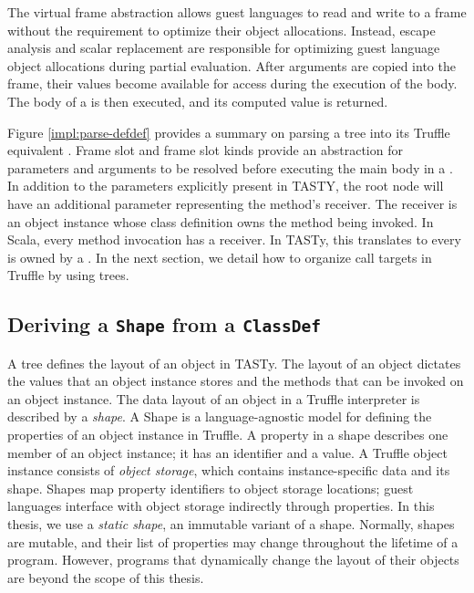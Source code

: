 The virtual frame abstraction allows guest languages to read and write to a frame without the requirement to optimize their object allocations.
Instead, escape analysis and scalar replacement are responsible for optimizing guest language object allocations during partial evaluation. 
After arguments are copied into the frame, their values become available for access during the execution of the body.
The body of a  is then executed, and its computed value is returned.

Figure \ref{impl:parse-defdef} provides a summary on parsing a  tree into its Truffle equivalent .
Frame slot and frame slot kinds provide an abstraction for parameters and arguments to be resolved before executing the main body in a .
In addition to the parameters explicitly present in TASTY, the root node will have an additional parameter representing the method's receiver.
The receiver is an object instance whose class definition owns the method being invoked.
In Scala, every method invocation has a receiver.
In TASTy, this translates to every  is owned by a .
In the next section, we detail how to organize call targets in Truffle by using  trees.

\subsection{Deriving a \texttt{Shape} from a \texttt{ClassDef}}
\label{impl:subsection:classdef}

A  tree defines the layout of an object in TASTy.
The layout of an object dictates the values that an object instance stores and the methods that can be invoked on an object instance.
The data layout of an object in a Truffle interpreter is described by a \textit{shape}\cite{self:prototypes,truffle:object-model}.
A Shape is a language-agnostic model for defining the properties of an object instance in Truffle.
A property in a shape describes one member of an object instance; it has an identifier and a value.
A Truffle object instance consists of \textit{object storage}, which contains instance-specific data and its shape.
Shapes map property identifiers to object storage locations; guest languages interface with object storage indirectly through properties.
In this thesis, we use a \textit{static shape}, an immutable variant of a shape.
Normally, shapes are mutable, and their list of properties may change throughout the lifetime of a program\cite{truffleruby:object-model}.
However, programs that dynamically change the layout of their objects\cite{java:reflection} are beyond the scope of this thesis.

